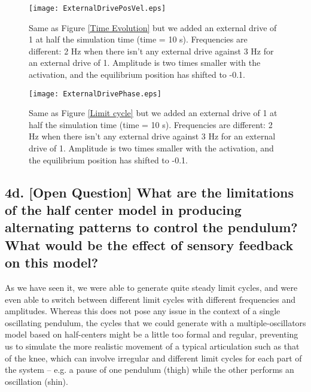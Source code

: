 \documentclass{cmc}
\begin{document}
\begin{figure}[H]
  \centering
  \texttt{[image: ExternalDrivePosVel.eps]}
  \caption{Same as Figure \ref{Time Evolution} but we added an external drive of 1 at half the simulation time (time = 10 s). Frequencies are different: 2 Hz when there isn't any external drive against 3 Hz for an external drive of 1. Amplitude is two times smaller with the activation, and the equilibrium position has shifted to -0.1.}
  \label{DD1}
\end{figure}

\begin{figure}[H]
  \centering
  \texttt{[image: ExternalDrivePhase.eps]}
  \caption{Same as Figure \ref{Limit cycle} but we added an external drive of 1 at half the simulation time (time = 10 s). Frequencies are different: 2 Hz when there isn't any external drive against 3 Hz for an external drive of 1. Amplitude is two times smaller with the activation, and the equilibrium position has shifted to -0.1.}
  \label{DD2}
\end{figure}

\newpage
\subsection*{4d. [Open Question] What are the limitations of the half center model in
  producing alternating patterns to control the pendulum? What would
  be the effect of sensory feedback on this model?}
\label{sec:4d}

As we have seen it, we were able to generate quite steady limit cycles, and were even able to switch between different limit cycles with different frequencies and amplitudes. Whereas this does not pose any issue in the context of a single oscillating pendulum, the cycles that we could generate with a multiple-oscillators model based on half-centers might be a little too formal and regular, preventing us to simulate the more realistic movement of a typical articulation such as that of the knee, which can involve irregular and different limit cycles for each part of the system  -- e.g. a pause of one pendulum (thigh) while the other performs an oscillation (shin).

\end{document}

